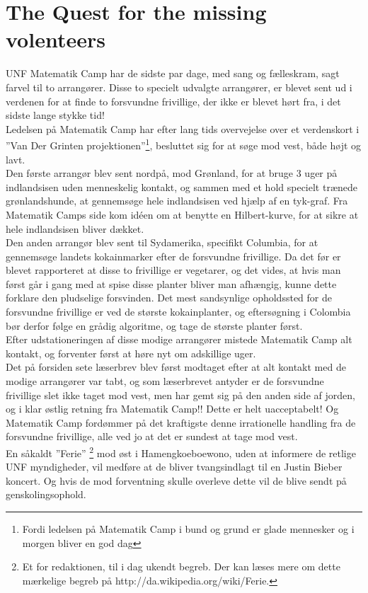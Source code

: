 \begin{minipage}[t]{185mm}
\vspace{3mm}
\section*{The Quest for the missing volenteers}
UNF Matematik Camp har de sidste par dage, med sang og fælleskram, sagt farvel til to arrangører. Disse to specielt udvalgte arrangører, er blevet sent ud i verdenen for at finde to forsvundne frivillige, der ikke er blevet hørt fra, i det sidste lange stykke tid! \\ 
Ledelsen på Matematik Camp har efter lang tids overvejelse over et verdenskort i ”Van Der Grinten projektionen”\footnote{Fordi ledelsen på Matematik Camp i bund og grund er glade mennesker og i morgen bliver en god dag}, besluttet sig for at søge mod vest, både højt og lavt. \\
Den første arrangør blev sent nordpå, mod Grønland, for at bruge 3 uger på indlandsisen uden menneskelig kontakt, og sammen med et hold specielt trænede grønlandshunde, at gennemsøge hele indlandsisen ved hjælp af en tyk-graf. Fra  Matematik Camps side kom idéen om at benytte en Hilbert-kurve, for at sikre at hele indlandsisen bliver dækket. \\
Den anden arrangør blev sent til Sydamerika, specifikt Columbia, for at gennemsøge landets kokainmarker efter de forsvundne frivillige. Da det før er blevet rapporteret at disse to frivillige er vegetarer, og det vides, at hvis man først går i gang med at spise disse planter bliver man afhængig, kunne dette forklare den pludselige forsvinden. Det mest sandsynlige opholdssted for de forsvundne frivillige er ved de største kokainplanter, og eftersøgning i Colombia bør derfor følge en grådig algoritme, og tage de største planter først. \\
Efter udstationeringen af disse modige arrangører mistede Matematik Camp alt kontakt, og forventer først at høre nyt om adskillige uger. \\
Det på forsiden sete læserbrev blev først modtaget efter at alt kontakt med de modige arrangører var tabt, og som læserbrevet antyder er de forsvundne frivillige slet ikke taget mod vest, men har gemt sig på den anden side af jorden, og i klar østlig retning fra Matematik Camp!! Dette er helt uacceptabelt! Og Matematik Camp fordømmer på det kraftigste denne irrationelle handling fra de forsvundne frivillige, alle ved jo at det er sundest at tage mod vest. \\
En såkaldt ”Ferie” \footnote{Et for redaktionen, til i dag ukendt begreb. Der kan læses mere om dette mærkelige begreb på http://da.wikipedia.org/wiki/Ferie.} mod øst i Hamengkoeboewono, uden at informere de retlige UNF myndigheder, vil medføre at de bliver tvangsindlagt til en Justin Bieber koncert. Og hvis de mod forventning skulle overleve dette vil de blive sendt på genskolingsophold.


\end{minipage}
